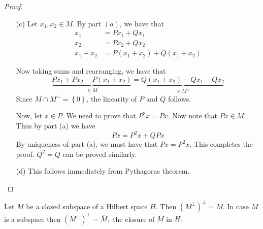 \begin{proof}
\begin{itemize}
	\item [(c)] Let $x_{1}, x_{2} \in M$. By part $(a)$, we have that 
	    \begin{align*}
		x_{1} &= Px_{1} + Qx_{1} \\
		x_{2} &= Px_{2} + Qx_{2} \\
		x_{1} + x_{2} &= P\left( x_{1} + x_{2} \right) + Q \left( x_{1} + x_{2} \right)
	    \end{align*}

	    Now taking sums and rearranging, we have that
	    \begin{equation*}
		\underbrace{Px_{1} + Px_{2} - P\left( x_{1} + x_{2} \right)}_{\in M} = \underbrace{Q\left( x_{1} + x_{2} \right) - Qx_{1} - Qx_{2}}_{\in M^{\perp}}
	    \end{equation*}
	    Since $M \cap M^{\perp} = \left\{ 0 \right\}$, the linearity of $P$ and $Q$ follows.

	    Now, let $x\in P$. We need to prove that $P^{2}x = Px$. Now note that $Px \in M$. Thus by part (a) we have
	    \begin{equation*}
		Px = P^{2} x + QPx
	    \end{equation*}
	    By uniqueness of part (a), we must have that $Px = P^{2}x$. This completes the proof. $Q^{2}= Q$ can be proved similarly.

	\item [(d)] This follows immediately from Pythagoras theorem.
    \end{itemize}
\end{proof}

\begin{corollary}
Let $M$ be a closed subspace of a Hilbert space $H.$ Then $(M^{\perp})^{\perp} = M.$ In case $M$ is a subspace then $(M^{\perp})^{\perp} = \overline{M},$ the closure of $M$ in $H.$
\end{corollary}



